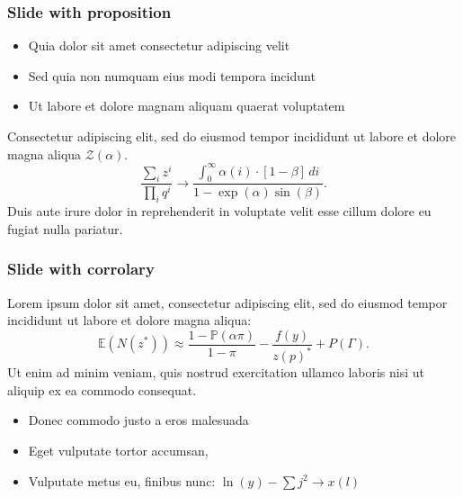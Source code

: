 \documentclass[11pt, aspectratio=169, xcolor={dvipsnames}, usepdftitle=false]{beamer}
\begin{document}
\begin{frame}
\frametitle{Slide with proposition}
\begin{itemize}
\item Quia dolor sit amet consectetur adipiscing velit
\item Sed quia non numquam eius modi tempora incidunt
\item Ut labore et dolore magnam aliquam quaerat voluptatem
\end{itemize}
\begin{proposition}
Consectetur adipiscing elit, sed do eiusmod tempor incididunt ut labore et dolore magna aliqua $\mathcal{Z}(\alpha)$. 
\begin{equation*}
\frac{\sum_i z^i}{\prod_i q^i} \to \frac{\int_{0}^{\infty} \alpha(i) \cdot [1-\beta]\,di}{1-\exp(\alpha)\sin(\beta)}.
\end{equation*}
Duis aute irure dolor in reprehenderit in voluptate velit esse cillum dolore eu fugiat nulla pariatur. 
\end{proposition}
\end{frame}

\begin{frame}
\frametitle{Slide with corrolary}
\begin{corollary}
Lorem ipsum dolor sit amet, consectetur adipiscing elit, sed do eiusmod tempor incididunt ut labore et dolore magna aliqua:
\begin{equation*}
\mathbb{E}(N(z^*)) \approx \frac{1-\mathbb{P}(\alpha\pi)}{1-\pi}- \frac{f(y)}{z(p)^*} + P(\Gamma).
\end{equation*}
Ut enim ad minim veniam, quis nostrud exercitation ullamco laboris nisi ut aliquip ex ea commodo consequat.
\end{corollary}
\begin{itemize}
\item Donec commodo justo a eros malesuada
\item Eget vulputate tortor accumsan, 
\item Vulputate metus eu, finibus nunc: $\ln(y) - \sum j^2 \to x(l)$
\end{itemize}
\end{frame}

\begin{frame}
\end{frame}
\end{document}
